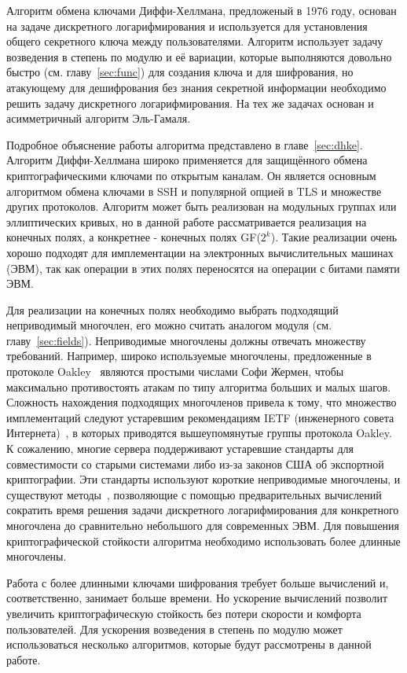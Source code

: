 \documentclass[times,specification,annotation]{itmo-student-thesis}
\begin{document}
Алгоритм обмена ключами Диффи-Хеллмана, предложеный в 1976 году, основан на задаче дискретного логарифмирования
и используется для установления общего секретного ключа между пользователями.
Алгоритм  использует задачу возведения в степень по модулю и её вариации, которые выполняются довольно быстро
(см. главу~\ref{sec:func}) для создания ключа и для шифрования, но атакующему для дешифрования без знания секретной
информации необходимо решить задачу дискретного логарифмирования.
На тех же задачах основан и асимметричный алгоритм Эль-Гамаля.

Подробное объяснение работы алгоритма представлено в главе~\ref{sec:dhke}.
Алгоритм Диффи-Хеллмана широко применяется для защищённого обмена криптографическими ключами
по открытым каналам.
Он является основным алгоритмом обмена ключами в SSH и популярной опцией в TLS и множестве других протоколов.
Алгоритм может быть реализован на модульных группах или эллиптических кривых, но в данной работе рассматривается
реализация на конечных полях, а конкретнее - конечных полях GF($2^k$).
Такие реализации очень хорошо подходят для имплементации на электронных вычислительных машинах (ЭВМ),
так как операции в этих полях переносятся на операции с битами памяти ЭВМ.

Для реализации на конечных полях необходимо выбрать подходящий неприводимый многочлен, его можно считать аналогом модуля (см. главу~\ref{sec:fields}).
Неприводимые многочлены должны отвечать множеству требований.
Например, широко используемые многочлены, предложенные в протоколе Oakley~\cite{rfc2412} являются простыми числами
Софи Жермен, чтобы максимально противостоять атакам по типу алгоритма больших и малых шагов.
Сложность нахождения подходящих многочленов привела к тому, что множество имплементаций следуют устаревшим рекомендациям
IETF (инженерного совета Интернета)~\cite{rfc7296}, в которых приводятся вышеупомянутые группы протокола Oakley.
К сожалению, многие сервера поддерживают устаревшие стандарты для совместимости со старыми системами либо
из-за законов США об экспортной криптографии.
Эти стандарты используют короткие неприводимые многочлены, и существуют методы~\cite{adr15},
позволяющие с помощью предварительных вычислений сократить время решения задачи дискретного логарифмирования для
конкретного многочлена до сравнительно небольшого для современных ЭВМ.
Для повышения криптографической стойкости алгоритма необходимо использовать более длинные многочлены.\par
Работа с более длинными ключами шифрования требует больше вычислений и, соответственно, занимает больше времени.
Но ускорение вычислений позволит увеличить криптографическую стойкость без потери скорости и комфорта пользователей.
Для ускорения возведения в степень по модулю может использоваться несколько алгоритмов, которые будут рассмотрены в
данной работе.
\end{document}
